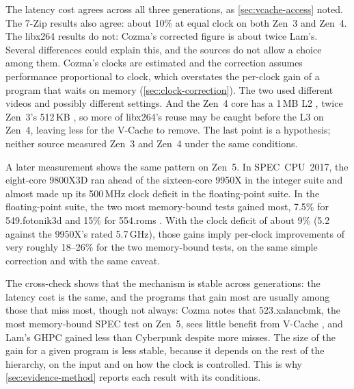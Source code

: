 The latency cost agrees across all three generations, as \cref{sec:vcache-access} noted. The 7-Zip results also agree: about 10\% at equal clock on both Zen~3 and Zen~4. The libx264 results do not: Cozma's corrected figure is about twice Lam's. Several differences could explain this, and the sources do not allow a choice among them. Cozma's clocks are estimated and the correction assumes performance proportional to clock, which overstates the per-clock gain of a program that waits on memory (\cref{sec:clock-correction}). The two used different videos and possibly different settings. And the Zen~4 core has a 1\,MB L2 \cite{advancedmicrodevicesinc.4thGenAMD2023}, twice Zen~3's 512\,KB \cite[slide~19]{wuu2022vcache}, so more of libx264's reuse may be caught before the L3 on Zen~4, leaving less for the V-Cache to remove. The last point is a hypothesis; neither source measured Zen~3 and Zen~4 under the same conditions.

A later measurement shows the same pattern on Zen~5. In SPEC~CPU~2017, the eight-core 9800X3D ran ahead of the sixteen-core 9950X in the integer suite and almost made up its 500\,MHz clock deficit in the floating-point suite. In the floating-point suite, the two most memory-bound tests gained most, 7.5\% for 549.fotonik3d and 15\% for 554.roms \cite{cozmaAMDs9800X3D2nd2024}. With the clock deficit of about 9\% (5.2 against the 9950X's rated 5.7\,GHz), those gains imply per-clock improvements of very roughly 18--26\% for the two memory-bound tests, on the same simple correction and with the same caveat.

The cross-check shows that the mechanism is stable across generations: the latency cost is the same, and the programs that gain most are usually among those that miss most, though not always: Cozma notes that 523.xalancbmk, the most memory-bound SPEC test on Zen~5, sees little benefit from V-Cache \cite{cozmaAMDs9800X3D2nd2024}, and Lam's GHPC gained less than Cyberpunk despite more misses. The size of the gain for a given program is less stable, because it depends on the rest of the hierarchy, on the input and on how the clock is controlled. This is why \cref{sec:evidence-method} reports each result with its conditions.

